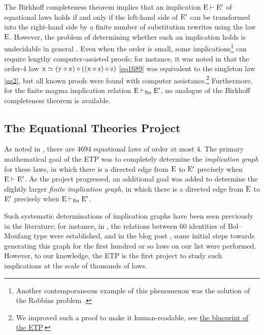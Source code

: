 The Birkhoff completeness theorem \cite[Th.~3.5.14]{term-rewriting} implies that an implication ${\mathrm{E}} \vdash {\mathrm{E}'}$ of equational laws holds if and only if the left-hand side of ${\mathrm{E}'}$ can be transformed into the right-hand side by a finite number of substitution rewrites using the law $\mathrm{E}$. However, the problem of determining whether such an implication holds is undecidable in general \cite{mckenzie}. Even when the order is small, some implications\footnote{Another contemporaneous example of this phenomenon was the solution of the Robbins problem \cite{robbins}.} can require lengthy computer-assisted proofs; for instance, it was noted in \cite{Kisielewicz2} that the order-$4$ law $\mathrm{x} \simeq (\mathrm{y} \diamond \mathrm{x}) \diamond ((\mathrm{x} \diamond \mathrm{z}) \diamond \mathrm{z})$ \eqref{eq1689} was equivalent to the singleton law \eqref{eq2}, but all known proofs were found with computer assistance.\footnote{We improved such a proof to make it human-readable, see \href{https://teorth.github.io/equational_theories/blueprint/implications-chapter.html}{the blueprint of the ETP}.}  Furthermore, for the finite magma implication relation ${\mathrm{E}} \vdash_{\mathrm{fin}} {\mathrm{E}'}$, no analogue of the Birkhoff completeness theorem is available.

\subsection{The Equational Theories Project}

As noted in , there are $\num{4694}$ equational laws of order at most $4$. The primary mathematical goal of the ETP was to completely determine the \emph{implication graph} for these laws, in which there is a directed edge from $\mathrm{E}$ to ${\mathrm{E}'}$ precisely when ${\mathrm{E}} \vdash {\mathrm{E}'}$. As the project progressed, an additional goal was added to determine the slightly larger \emph{finite implication graph}, in which there is a directed edge from $\mathrm{E}$ to ${\mathrm{E}'}$ precisely when ${\mathrm{E}} \vdash_{\mathrm{fin}} {\mathrm{E}'}$.

Such systematic determinations of implication graphs have been seen previously in the literature; for instance, in \cite{phillips-vojtechovsky}, the relations between $60$ identities of Bol--Moufang type were established, and in the blog post \cite[\S 17]{Wolfram_2022}, some initial steps towards generating this graph for the first hundred or so laws on our list were performed. However, to our knowledge, the ETP is the first project to study such implications at the scale of thousands of laws.

